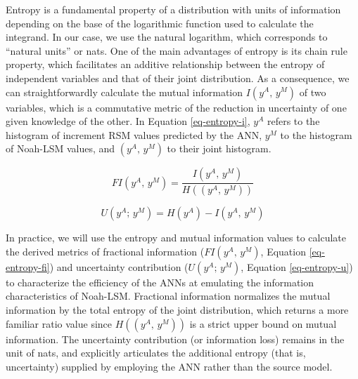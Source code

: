 Entropy is a fundamental property of a distribution with units of information depending on the base of the logarithmic function used to calculate the integrand. In our case, we use the natural logarithm, which corresponds to ``natural units'' or nats. One of the main advantages of entropy is its chain rule property, which facilitates an additive relationship between the entropy of independent variables and that of their joint distribution. As a consequence, we can straightforwardly calculate the mutual information $I(y^A,\,y^M)$ of two variables, which is a commutative metric of the reduction in uncertainty of one given knowledge of the other. In Equation \ref{eq-entropy-i}, $y^A$ refers to the histogram of increment RSM values predicted by the ANN, $y^M$ to the histogram of Noah-LSM values, and $(y^A,\,y^M)$ to their joint histogram.

\begin{equation}\label{eq-entropy-fi}
    FI(y^A,\,y^M) = \frac{I(y^A,\,y^M)}{H((y^A,\,y^M))} %
\end{equation}

\begin{equation}\label{eq-entropy-u}
    U(y^A;\,y^M) = H(y^A) - I(y^A,\,y^M) %
\end{equation}

In practice, we will use the entropy and mutual information values to calculate the derived metrics of fractional information ($FI(y^A,\,y^M)$, Equation \ref{eq-entropy-fi}) and uncertainty contribution ($U(y^A;\,y^M)$, Equation \ref{eq-entropy-u}) to characterize the efficiency of the ANNs at emulating the information characteristics of Noah-LSM. Fractional information normalizes the mutual information by the total entropy of the joint distribution, which returns a more familiar ratio value since $H((y^A,\,y^M))$ is a strict upper bound on mutual information. The uncertainty contribution (or information loss) remains in the unit of nats, and explicitly articulates the additional entropy (that is, uncertainty) supplied by employing the ANN rather than the source model.
